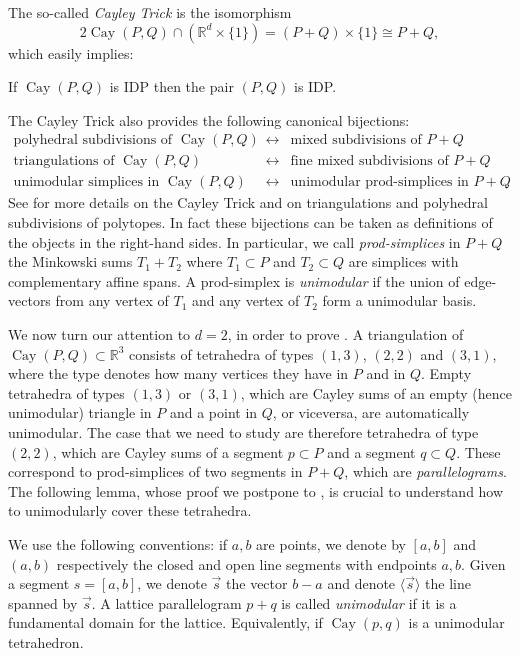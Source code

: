 \documentclass[12pt]{article}
\newcommand{\R}{ \ensuremath{\mathbb{R}}}
\newcommand{\cayley}{\operatorname{Cay}}
\newcommand{\vecline}[1]{\langle \vec #1 \rangle}
\begin{document}
The so-called \emph{Cayley Trick} is the isomorphism
\[
2\cayley(P, Q) \cap (\R^d\times \{1\}) = (P+Q) \times \{1\} \cong P+Q,
\]
which easily implies:

\begin{proposition}
\label{prop:mixedIDP}
If $\cayley(P,Q)$ is IDP then the pair $(P,Q)$ is IDP.
\end{proposition} 


The Cayley Trick also provides the following canonical bijections:
\[
\begin{array}{ccc}
\text{polyhedral subdivisions of $\cayley(P,Q)$} &\leftrightarrow& \text{mixed subdivisions of $P + Q$}\\
\text{triangulations of $\cayley(P,Q)$} &\leftrightarrow& \text{fine mixed subdivisions of $P + Q$}\\
\text{unimodular simplices in $\cayley(P,Q)$} &\leftrightarrow& \text{unimodular prod-simplices in $P + Q$}.
\end{array}
\]
See \cite{DLRS2010} for more details on the Cayley Trick and on triangulations and polyhedral subdivisions of polytopes.
In fact these bijections can be taken as definitions of the objects in the right-hand sides. In particular, 
we call \emph{prod-simplices} in $P+Q$ the Minkowski sums $T_1+T_2$ where $T_1\subset P$ and $T_2\subset Q$ are simplices with complementary affine spans. A prod-simplex is \emph{unimodular} if the union of edge-vectors from any vertex of $T_1$ and any vertex of $T_2$ form a unimodular basis.

\medskip

We now turn our attention to $d=2$, in order to prove . A triangulation of $\cayley(P,Q)\subset \R^3$ consists of tetrahedra of types $(1,3)$, $(2,2)$ and $(3,1)$, where the type denotes how many vertices they have in $P$ and in $Q$. Empty tetrahedra of types $(1,3)$ or $(3,1)$, which are Cayley sums of an empty (hence unimodular) triangle in $P$ and a point in $Q$, or viceversa, are automatically unimodular. The case that we need to study are therefore tetrahedra of type $(2,2)$, which are Cayley sums of a segment $p\subset P$ and a segment $q\subset Q$. These correspond to prod-simplices of two segments in $P+Q$, which are \emph{parallelograms}.
The following lemma, whose proof we postpone to , is crucial to understand how to unimodularly cover these tetrahedra. 

We use the following conventions: if $a, b$ are points, we denote by $[a,b]$ and $(a,b)$ respectively the closed and open line segments with endpoints $a,b$. Given a segment $s=[a,b]$, we denote $\vec s$ the vector $b-a$ and denote $\vecline s$ the line spanned by $\vec s$. A lattice parallelogram $p+q$ is called \emph{unimodular} if it is a fundamental domain for the lattice. Equivalently, if $\cayley(p,q)$ is a unimodular tetrahedron.
\end{document}
